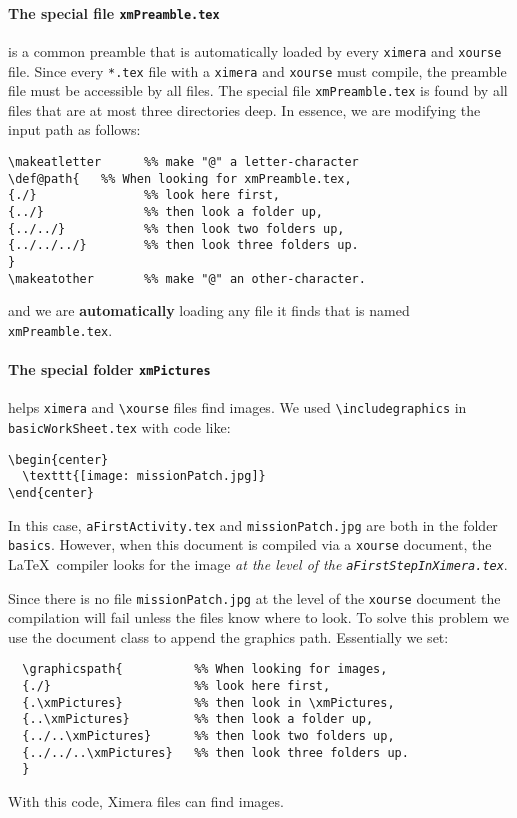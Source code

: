 \documentclass{ximera}
\begin{document}
\paragraph{The special file \texttt{xmPreamble.tex}} is a common preamble that is automatically loaded by every  \verb!ximera! and \verb!xourse! file.
Since every \verb!*.tex! file with a \verb!ximera! and \verb!xourse! must compile, the
preamble file must be accessible  by all files. The special file
\verb!xmPreamble.tex! is found by all files that are at most three directories
deep. In essence, we are modifying the input path as follows:
\begin{verbatim}
\makeatletter      %% make "@" a letter-character
\def@path{   %% When looking for xmPreamble.tex,
{./}               %% look here first,
{../}              %% then look a folder up,
{../../}           %% then look two folders up,
{../../../}        %% then look three folders up.
}
\makeatother       %% make "@" an other-character.
\end{verbatim}
and we are \textbf{automatically} loading any file it finds that is named \verb!xmPreamble.tex!.



\paragraph{The special folder \texttt{xmPictures}} helps \verb!ximera! and  \verb!\xourse! files find images.
We used \verb!\includegraphics! in \texttt{basicWorkSheet.tex} with code like:
\begin{verbatim} 
\begin{center}
  \texttt{[image: missionPatch.jpg]}
\end{center}
\end{verbatim}
In this case, \texttt{aFirstActivity.tex}  and \verb!missionPatch.jpg! are both
in the folder
\texttt{basics}. However, when
this document is compiled via a \verb!xourse! document, the \LaTeX\ compiler
looks for the image \textit{at the level of the
  \texttt{aFirstStepInXimera.tex}}.

Since there is no file \verb!missionPatch.jpg! at the
level of the
\verb!xourse! document the compilation will fail unless the files know where to look. To solve this
problem we use the document class to append the graphics path. Essentially we set:
\begin{verbatim}
  \graphicspath{          %% When looking for images,
  {./}                    %% look here first,
  {.\xmPictures}          %% then look in \xmPictures,
  {..\xmPictures}         %% then look a folder up,
  {../..\xmPictures}      %% then look two folders up,
  {../../..\xmPictures}   %% then look three folders up.
  }
  \end{verbatim}
With this code, Ximera files can find images. 
\end{document}
